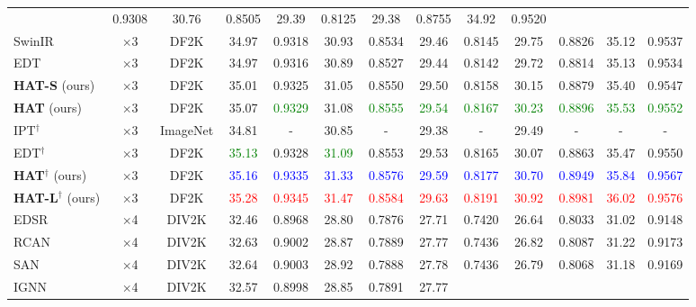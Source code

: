 \documentclass[10pt,twocolumn,letterpaper]{article}
\begin{document}
\begin{table*}[!ht]
\begin{center}
{\begin{tabular}{|l|c|c|c|c|c|c|c|c|c|c|c|c|}
& {0.9308}
& {30.76}
& {0.8505}
& {29.39}
& {0.8125}
& {29.38}
& {0.8755}
& {34.92}
& {0.9520}
\\
SwinIR & $\times$3 & DF2K & 34.97
& 0.9318
& 30.93
& 0.8534
& 29.46
& 0.8145
& 29.75
& 0.8826
& 35.12
& 0.9537
\\
EDT & $\times$3 & DF2K & 34.97
& 0.9316
& 30.89
& 0.8527
& 29.44
& 0.8142
& 29.72
& 0.8814
& 35.13
& 0.9534
\\
\textbf{HAT-S} (ours) & $\times$3 & DF2K & {35.01}
& {0.9325}
& {31.05}
& {0.8550}
& {29.50}
& {0.8158}
& {30.15}
& {0.8879}
& {35.40}
& {0.9547}
\\
\textbf{HAT} (ours) & $\times$3 & DF2K & {35.07}
& \textcolor{green}{0.9329}
& {31.08}
& \textcolor{green}{0.8555}
& \textcolor{green}{29.54}
& \textcolor{green}{0.8167}
& \textcolor{green}{30.23}
& \textcolor{green}{0.8896}
& \textcolor{green}{35.53}
& \textcolor{green}{0.9552}
\\
\hdashline
IPT$^\dagger$ & $\times$3 & ImageNet & {34.81}
& {-}
& {30.85}
& {-}
& {29.38}
& {-}
& {29.49}
& {-}
& {-}
& {-}
\\
EDT$^\dagger$ & $\times$3 & DF2K & \textcolor{green}{35.13}
& 0.9328
& \textcolor{green}{31.09}
& 0.8553
& {29.53}
& {0.8165}
& 30.07
& 0.8863
& 35.47
& 0.9550
\\
\textbf{HAT}$^\dagger$ (ours) & $\times$3 & DF2K & \textcolor{blue}{35.16}
& \textcolor{blue}{0.9335}
& \textcolor{blue}{31.33}
& \textcolor{blue}{0.8576}
& \textcolor{blue}{29.59}
& \textcolor{blue}{0.8177}
& \textcolor{blue}{30.70}
& \textcolor{blue}{0.8949}
& \textcolor{blue}{35.84}
& \textcolor{blue}{0.9567}
\\
\textbf{HAT-L}$^\dagger$ (ours) & $\times$3 & DF2K & \textcolor{red}{35.28}
& \textcolor{red}{0.9345}
& \textcolor{red}{31.47}
& \textcolor{red}{0.8584}
& \textcolor{red}{29.63}
& \textcolor{red}{0.8191}
& \textcolor{red}{30.92}
& \textcolor{red}{0.8981}
& \textcolor{red}{36.02}
& \textcolor{red}{0.9576}
\\
\hline
\hline
EDSR & $\times$4 & DIV2K & 32.46
& 0.8968
& 28.80
& 0.7876
& 27.71
& 0.7420
& 26.64
& 0.8033
& 31.02
& 0.9148
\\
RCAN & $\times$4 & DIV2K & 32.63
& 0.9002
& 28.87
& 0.7889
& 27.77
& 0.7436
& 26.82
& 0.8087
& 31.22
& 0.9173
\\
SAN & $\times$4 & DIV2K & {32.64}
& {0.9003}
& {28.92}
& {0.7888}
& {27.78}
& {0.7436}
& {26.79}
& {0.8068}
& {31.18}
& {0.9169}
\\
IGNN & $\times$4 & DIV2K & {32.57}
& {0.8998}
& {28.85}
& {0.7891}
& {27.77}

\end{tabular}}
\end{center}
\end{table*}
\end{document}
